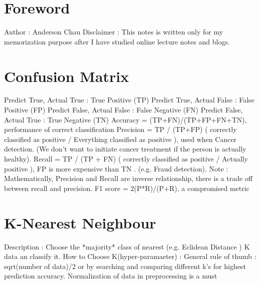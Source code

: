 \documentclass{article}
\begin{document}
\section{Foreword}
Author : Anderson Chau
\newline 
\newline 
Disclaimer : This notes is written only for my memorization purpose after I have studied online lecture notes and blogs. 
\section{Confusion Matrix}
Predict True, Actual True : True Positive (TP) \newline
Predict True, Actual False : False Positive (FP) \newline
Predict False, Actual False : False Negative (FN)\newline 
Predict False, Actual True : True Negative (TN)\newline
\newline
\newline
Accuracy = (TP+FN)/(TP+FP+FN+TN), performance of correct classification
\newline
\newline
Precision = TP / (TP+FP)  ( correctly classified as positive / Everything classified as positive ), used when Cancer detection. (We don't want to initiate cancer treatment if the person is actually healthy).  
\newline
\newline
Recall = TP / (TP + FN) ( correctly classified as positive / Actually positive ), FP is more expensive than TN . (e.g. Fraud detection).
\newline
\newline
Note : Mathematically, Precision and Recall are inverse relationship, there is a trade off between recall and precision.
\newline
\newline
F1 score = 2(P*R)/(P+R), a compromised metric
 
\section{K-Nearest Neighbour}
Description : Choose the *majority* class of nearest (e.g. Eclidean Distance ) K data an classify it. 
\newline
How to Choose K(hyper-paramaeter) : General rule of thumb : sqrt(number of data)/2 or by searching and comparing different k's for highest prediction accuracy.
\newline 
Normalization of data in preprocessing is a must
\end{document}
